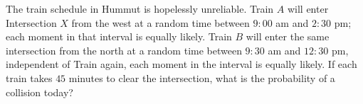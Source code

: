 The train schedule in Hummut is hopelessly unreliable. Train $A$ will enter Intersection $X$ from the west at a random time between $9:00$ am and $2:30$ pm; each moment in that interval is equally likely. Train $B$ will enter the same intersection from the north at a random time between $9:30$ am and $12:30$ pm, independent of Train  again, each moment in the interval is equally likely. If each train takes $45$ minutes to clear the intersection, what is the probability of a collision today?